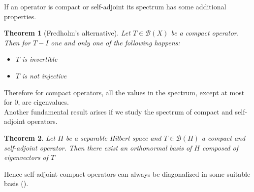 \documentclass[corpo=11pt, stile=classica, tipotesi=custom,
greek, evenboxes, english]{toptesi}
\numberwithin{equation}{chapter}
\newtheorem{teo}{Theorem}[chapter] %
\theoremstyle{remark}
\newcommand{\B}{\mathscr{B}} %
\begin{document}
If an operator is compact or self-adjoint its spectrum has some additional properties.
\begin{teo}[Fredholm's alternative]\label{Fredholm alternative}
	Let $T \in \B(X)$ be a compact operator. Then for $T-I$ one and only one of the following happens:
	\begin{itemize}
		\item $T$ is invertible
		\item $T$ is not injective
	\end{itemize}
\end{teo}
Therefore for compact operators, all the values in the spectrum, except at most for 0, are eigenvalues.\\
Another fundamental result arises if we study the spectrum of compact and self-adjoint operators.
\begin{teo}\label{self-adjoint compact operators are diagonalizable}
	Let $H$ be a separable Hilbert space and $T \in \B(H)$ a compact and self-adjoint operator. Then there exist an orthonormal basis of $H$ composed of eigenvectors of $T$
\end{teo}
Hence self-adjoint compact operators can always be diagonalized in some suitable basis (\cite{brezis}).
\end{document}
